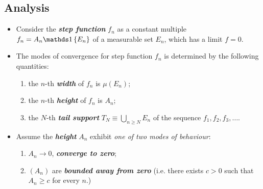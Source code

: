 \documentclass[11pt]{article}
\begin{document}
\subsection{Analysis}
\begin{itemize}
\item \begin{remark}
Consider the \emph{\textbf{step function}} $f_{n}$ as a constant multiple $f_n = A_n\ind{E_n}$ of a measurable set $E_n$, which has a limit $f=0$.
\end{remark}

\item  \begin{definition} The modes of convergence for step function $f_n$ is determined by the following quantities: 
\begin{enumerate}
\item the $n$-th \emph{\textbf{width}} of $f_{n}$ is $\mu(E_{n})$; 
\item the $n$-th \emph{\textbf{height}} of $f_{n}$ is $A_{n}$;
\item the $N$-th \emph{\textbf{tail support}} $T_N \equiv \bigcup_{n\ge N}E_{n}$ of the sequence $f_1, f_2, f_3, \ldots$.
\end{enumerate}
 \end{definition}
 
 \item \begin{remark}
Assume the \emph{\textbf{height}} $A_n$ exhibit \emph{one of two modes of behaviour}:
\begin{enumerate}
\item $A_n \rightarrow 0$, \emph{\textbf{converge to zero}};
\item $(A_n)$ are \emph{\textbf{bounded away from zero}} (i.e. there exists $c > 0$ such that $A_n \ge c$ for every $n$.) 
\end{enumerate}

  
 \end{remark}


\end{itemize}
\end{document}
